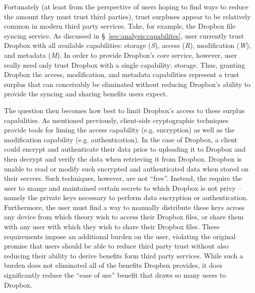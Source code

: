 Fortunately (at least from the perspective of users hoping to find
ways to reduce the amount they must trust third parties), trust
surpluses appear to be relatively common in modern third party
services. Take, for example, the Dropbox file syncing service. As
discussed in \S~\ref{sec:analysis:capabilites}, user currently trust
Dropbox with all available capabilities: storage (\emph{S}), access
(\emph{R}), modification (\emph{W}), and metadata (\emph{M}). In order
to provide Dropbox's core service, however, user really need only
trust Dropbox with a single capability: storage. Thus, granting
Dropbox the access, modification, and metadata capabilities represent
a trust surplus that can conceivably be eliminated without reducing
Dropbox's ability to provide the syncing and sharing benefits users
expect.

The question then becomes how best to limit Dropbox's access to these
surplus capabilities. As mentioned previously, client-side
cryptographic techniques provide tools for liming the access
capability (e.g. encryption) as well as the modification capability
(e.g. authentication). In the case of Dropbox, a client could encrypt
and authenticate their data prior to uploading it to Dropbox and then
decrypt and verify the data when retrieving it from Dropbox. Dropbox
is unable to read or modify such encrypted and authenticated data when
stored on their servers. Such techniques, however, are not
``free''. Instead, the require the user to mange and maintained
certain secrets to which Dropbox is not privy -- namely the private
keys necessary to perform data encryption or
authentication. Furthermore, the user must find a way to manually
distribute these keys across any device from which theory wish to
access their Dropbox files, or share them with any user with which
they wish to share their Dropbox files. These requirements impose an
additional burden on the user, violating the original promise that
users should be able to reduce third party trust without also reducing
their ability to derive benefits form third party services. While such
a burden does not eliminated all of the benefits Dropbox provides, it
does significantly reduce the ``ease of use'' benefit that draws so
many users to Dropbox.

